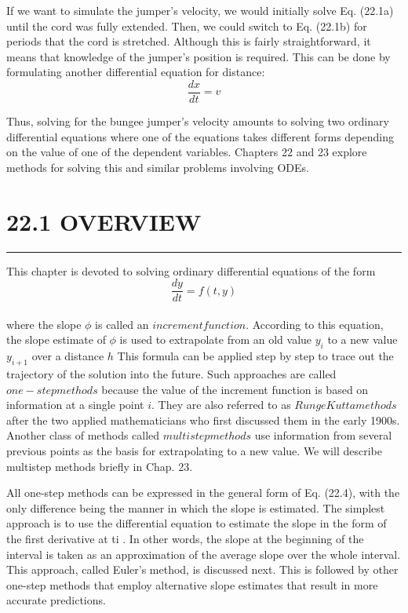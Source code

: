 \documentclass[../main.tex]{subfiles}
\begin{document}
If we want to simulate the jumper's velocity, we would initially solve Eq. (22.1a) until
the cord was fully extended. Then, we could switch to Eq. (22.1b) for periods that the cord
is stretched. Although this is fairly straightforward, it means that knowledge of the
jumper's position is required. This can be done by formulating another differential equation for distance:\\
\begin{equation}
\tag{22.2}
\dfrac{dx}{dt} = v
\end{equation}

Thus, solving for the bungee jumper's velocity amounts to solving two ordinary differential equations where one of the equations takes different forms depending on the value of one of the dependent variables. Chapters 22 and 23 explore methods for solving this and
similar problems involving ODEs.

\vspace{0,6in}
\section{22.1 OVERVIEW}
\vspace{0,1in}
\hrule
\vspace{0,1in}
This chapter is devoted to solving ordinary differential equations of the form
\begin{equation}
\tag{22.3}
\dfrac{dy}{dt} = f(t,y)
\end{equation}\\
where the slope $\phi$ is called an $increment function$. According to this equation, the slope estimate of $\phi$ is used to extrapolate from an old value $y_{i}$ to a new value $y_{i+1}$ over a distance $h$ This formula can be applied step by step to trace out the trajectory of the solution into
the future. Such approaches are called $one-step methods$ because the value of the increment
function is based on information at a single point $i$. They are also referred to as $RungeKutta methods$ after the two applied mathematicians who first discussed them in the early
1900s. Another class of methods called $multistep methods$ use information from several
previous points as the basis for extrapolating to a new value. We will describe multistep
methods briefly in Chap. 23.

All one-step methods can be expressed in the general form of Eq. (22.4), with the only
difference being the manner in which the slope is estimated. The simplest approach is to
use the differential equation to estimate the slope in the form of the first derivative at ti . In
other words, the slope at the beginning of the interval is taken as an approximation of the
average slope over the whole interval. This approach, called Euler's method, is discussed
next. This is followed by other one-step methods that employ alternative slope estimates
that result in more accurate predictions.
\end{document}
